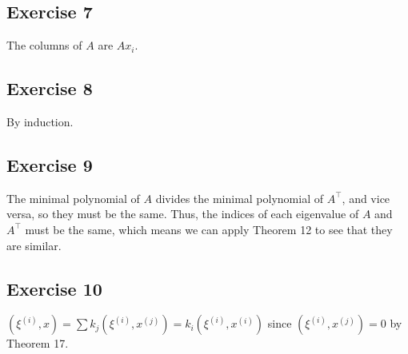 \subsection{Exercise 7}
The columns of $A$ are $Ax_i$.

\subsection{Exercise 8}
By induction.

\subsection{Exercise 9}
The minimal polynomial of $A$ divides the minimal polynomial of $A^{\top}$, and vice versa,
so they must be the same. Thus, the indices of each eigenvalue of $A$ and $A^{\top}$ must be the same,
which means we can apply Theorem 12 to see that they are similar.

\subsection{Exercise 10}
$(\xi^{(i)}, x) = \sum k_j (\xi^{(i)}, x^{(j)}) = k_i (\xi^{(i)}, x^{(i)})$ since
$(\xi^{(i)}, x^{(j)}) = 0$ by Theorem 17.

